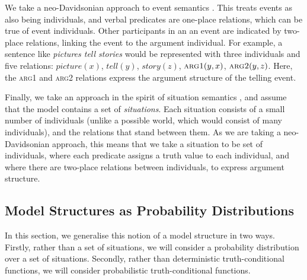\documentclass[a4paper,11pt]{article}
\begin{document}

We take a neo-Davidsonian approach to event semantics
\citep{davidson1967event, parsons1990event}.
This treats events as also being individuals,
and verbal predicates are one-place relations,
which can be true of event individuals.
Other participants in an an event are indicated by two-place relations,
linking the event to the argument individual.
For example, a sentence like \textit{pictures tell stories}
would be represented with three individuals and five relations:
$\textit{picture}(x)$,
$\textit{tell}(y)$,
$\textit{story}(z)$,
$\textsc{arg1}(y,x)$,
$\textsc{arg2}(y,z)$.
Here, the \textsc{arg1} and \textsc{arg2} relations
express the argument structure of the telling event.

Finally, we take an approach in the spirit of situation semantics \citep{barwise1983situation},
and assume that the model contains a set of \textit{situations}.
Each situation consists of a small number of individuals
(unlike a possible world, which would consist of many individuals),
and the relations that stand between them.
As we are taking a neo-Davidsonian approach,
this means that we take a situation to be set of individuals,
where each predicate assigns a truth value to each individual,
and where there are two-place relations between individuals,
to express argument structure.



\vspace*{-1mm}
\subsection{Model Structures as Probability Distributions}
\label{sec:model-prob}

In this section, we generalise this notion of a model structure in two ways.
Firstly, rather than a set of situations,
we will consider a probability distribution over a set of situations.
Secondly, rather than deterministic truth-conditional functions,
we will consider probabilistic truth-conditional functions.
\end{document}
